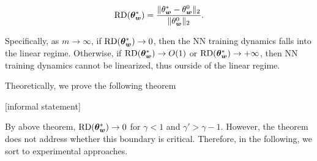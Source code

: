 \documentclass{article}
\begin{document}
\begin{equation}
    \mathrm{RD}(\bm{\theta}^*_{\bm{w}})=\frac{\lVert\theta_{\bm{w}}^*-\theta_{\bm{w}}^{0}\rVert_{2}}{\lVert\theta_{\bm{w}}^{0}\rVert_{2}}.
\end{equation}

Specifically, as $m\to\infty$, if $\mathrm{RD}(\bm{\theta}^*_{\bm{w}})\to0$, then the NN training dynamics falls into the linear regime. Otherwise, if $\mathrm{RD}(\bm{\theta}^*_{\bm{w}})\to O(1)$ or $\mathrm{RD}(\bm{\theta}^*_{\bm{w}})\to +\infty$, then NN training dynamics cannot be linearized, thus ourside of the linear regime.

Theoretically, we prove the following theorem

[informal statement]

By above theorem, $\mathrm{RD}(\bm{\theta}^*_{\bm{w}})\to0$ for $\gamma<1$ and $\gamma'>\gamma-1$. However, the theorem does not address whether this boundary is critical. Therefore, in the following, we sort to experimental approaches.
\end{document}
